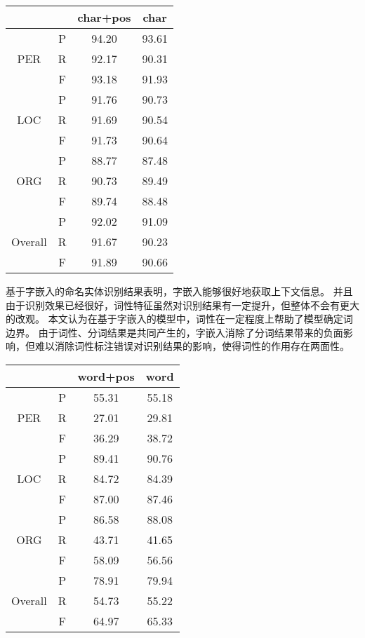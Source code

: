 \begin{table}[H]
    \centering
    \begin{tabular}{cccc}
        \toprule
        & & char+pos & char\\
        \midrule
        \multirow{3}{*}{PER} & P & 94.20 & 93.61\\
        & R & 92.17 & 90.31\\
        & F & 93.18 & 91.93 \\
        \midrule
        \multirow{3}{*}{LOC} & P & 91.76 & 90.73\\
        & R & 91.69 & 90.54 \\
        & F & 91.73 & 90.64\\
        \midrule
        \multirow{3}{*}{ORG} & P & 88.77 & 87.48\\
        & R & 90.73 & 89.49\\
        & F & 89.74 & 88.48\\
        \midrule
        \multirow{3}{*}{Overall} & P & 92.02 & 91.09\\
        & R & 91.67 & 90.23\\
        & F & 91.89 & 90.66\\
        \bottomrule
    \end{tabular}
    \label{tab:char-comparison}
\end{table}
基于字嵌入的命名实体识别结果表明，字嵌入能够很好地获取上下文信息。
并且由于识别效果已经很好，词性特征虽然对识别结果有一定提升，但整体不会有更大的改观。
本文认为在基于字嵌入的模型中，词性在一定程度上帮助了模型确定词边界。
由于词性、分词结果是共同产生的，字嵌入消除了分词结果带来的负面影响，但难以消除词性标注错误对识别结果的影响，使得词性的作用存在两面性。

\begin{table}[H]
    \centering
    \begin{tabular}{cccc}
        \toprule
        & & word+pos & word\\
        \midrule
        \multirow{3}{*}{PER} & P & 55.31 & 55.18\\
        & R & 27.01 & 29.81\\
        & F & 36.29 & 38.72 \\
        \midrule
        \multirow{3}{*}{LOC} & P & 89.41 & 90.76\\
        & R & 84.72 & 84.39 \\
        & F & 87.00 & 87.46\\
        \midrule
        \multirow{3}{*}{ORG} & P & 86.58 & 88.08\\
        & R & 43.71 & 41.65\\
        & F & 58.09 & 56.56\\
        \midrule
        \multirow{3}{*}{Overall} & P & 78.91 & 79.94\\
        & R & 54.73 & 55.22\\
        & F & 64.97  & 65.33\\
        \bottomrule
    \end{tabular}
    \label{tab:word-comparison}
\end{table}

